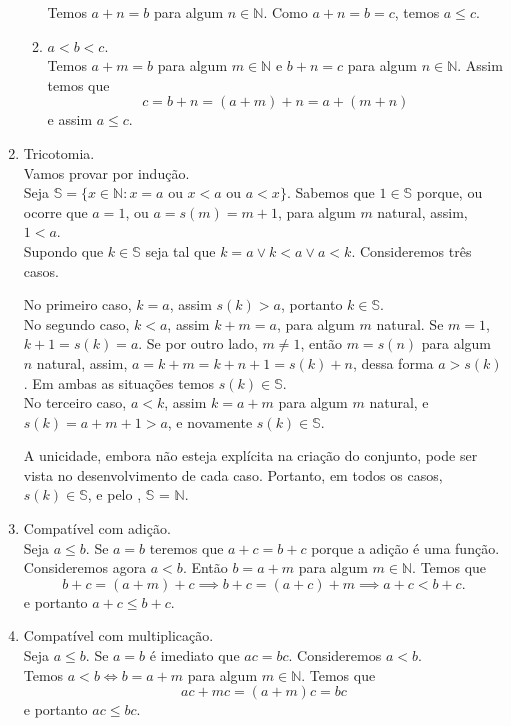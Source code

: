 \documentclass[../main.tex]{subfiles}
\begin{document}
\begin{dem}
\begin{enumerate}[label=(\roman*)]
\begin{enumerate}[label=(\arabic*)]
                    Temos $a+n = b$ para algum $n \in \mathbb{N}$. Como $a+n = b = c$, temos $a \leq c$.
                \item $a < b < c$. \\
                    Temos $a+m = b$ para algum $m \in \mathbb{N}$ e $b+n = c$ para algum $n \in \mathbb{N}$. Assim temos que 
                    \[c = b+n = (a+m)+n = a + (m+n)\]
                    e assim $a \leq c$.
            \end{enumerate}
        \item Tricotomia. \\
        Vamos provar por indução. \\
        Seja $\mathbb{S} = \{ x \in \mathbb{N} : x = a \text{ ou } x < a \text{ ou } a < x \}$. Sabemos que $1 \in \mathbb{S}$ porque, ou ocorre que $a = 1$, ou $a = s(m) = m + 1$, para algum $m$ natural, assim, $1 < a$. \\
        Supondo que $k \in \mathbb{S}$ seja tal que $k = a \lor k < a \lor a < k$. Consideremos três casos.  
        
        No primeiro caso, $k = a$, assim $s(k) > a$, portanto $k \in \mathbb{S}$. \\
        No segundo caso, $k < a$, assim $k + m = a$, para algum $m$ natural. Se $m = 1$, $k+1 = s(k) = a$. Se por outro lado, $m \neq 1$, então $m = s(n)$ para algum $n$ natural, assim, $a = k + m = k + n + 1 = s(k) + n$, dessa forma $a > s(k)$. Em ambas as situações temos $s(k) \in \mathbb{S}$. \\
        No terceiro caso, $a<k$, assim $k = a + m$ para algum $m$ natural, e $s(k) = a + m + 1 > a$, e novamente $s(k) \in \mathbb{S}$.

        A unicidade, embora não esteja explícita na criação do conjunto, pode ser vista no desenvolvimento de cada caso.
        Portanto, em todos os casos, $s(k) \in \mathbb{S}$, e pelo , $\mathbb{S}$ = $\mathbb{N}$.
        
        \item Compatível com adição. \\
        Seja $a \leq b$. Se $a = b$ teremos que $a+c = b+c$ porque a adição é uma função.
        Consideremos agora $a < b$. Então $b = a + m $ para algum $m \in \mathbb{N}$. Temos que
        \[ b+c = (a+m)+c \implies b+c = (a+c)+m \implies a+c < b+c. \]
        e portanto $a+c \leq b+c$.
        \item Compatível com multiplicação. \\
        Seja $a \leq b$. Se $a = b$ é imediato que $ac = bc$.
        Consideremos $a < b$. \\ 
        Temos $a < b \iff b = a + m$ para algum $m \in \mathbb{N}$. Temos que
        \[ ac + mc = (a+m)c = bc \]
        e portanto $ac \leq bc$.
        
     \end{enumerate}
\end{dem}
\end{document}
